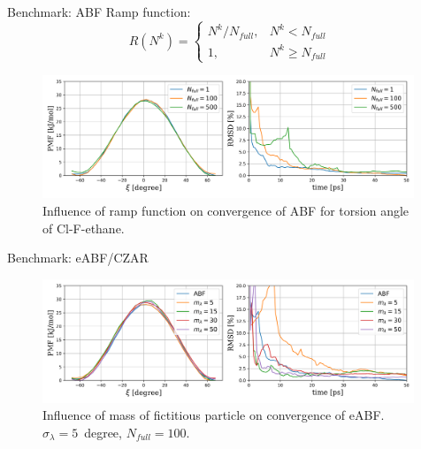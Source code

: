 \documentclass[10pt]{beamer}
\begin{document}
\begin{frame}{Benchmark: ABF}
Ramp function:
\begin{equation}
R(N^k)=\left\{\begin{array}{ll} N^k/N_{full}, & N^{k} < N_{full} \\
                                             1, & N^{k} \geq  N_{full}\end{array}\right.
\end{equation}
  \begin{figure}[H]
      \centering
      \includegraphics[width=0.99\textwidth]{bilder/benchmark/ABF_benchmark_nfull}
      \caption{Influence of ramp function on convergence of ABF for torsion angle of Cl-F-ethane.}
  \end{figure}
\end{frame}


\begin{frame}{Benchmark: eABF/CZAR}
 \begin{figure}[H]
  \centering
    \includegraphics[width=0.99\textwidth]{bilder/benchmark/eABF_benchmark_mass}
   \caption{Influence of mass of fictitious particle on convergence of eABF. $\sigma_\lambda=5$~degree, $N_{full}=100$.}
\end{figure}
\end{frame}
\end{document}
